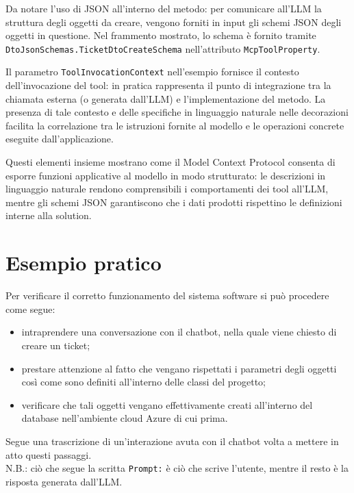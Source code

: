 Da notare l'uso di JSON all'interno del metodo: per comunicare all'LLM la struttura degli oggetti da creare, vengono forniti in input
gli schemi JSON degli oggetti in questione. Nel frammento mostrato, lo schema è fornito tramite \texttt{DtoJsonSchemas.TicketDtoCreateSchema}
nell'attributo \texttt{McpToolProperty}.

Il parametro \texttt{ToolInvocationContext} nell'esempio fornisce il contesto dell'invocazione del tool:
in pratica rappresenta il punto di integrazione tra la chiamata esterna (o generata dall'LLM) e l'implementazione del metodo.
La presenza di tale contesto e delle specifiche in linguaggio naturale nelle decorazioni facilita la correlazione tra le istruzioni fornite al modello
e le operazioni concrete eseguite dall'applicazione.

Questi elementi insieme mostrano come il Model Context Protocol consenta di esporre funzioni applicative al modello in modo strutturato:
le descrizioni in linguaggio naturale rendono comprensibili i comportamenti dei tool all'LLM, mentre gli schemi JSON garantiscono che i dati prodotti
rispettino le definizioni interne alla solution.

\section{Esempio pratico}
Per verificare il corretto funzionamento del sistema software si può procedere come segue:
\begin{itemize}
    \item intraprendere una conversazione con il chatbot, nella quale viene chiesto di creare un ticket;
    \item prestare attenzione al fatto che vengano rispettati i parametri degli oggetti così come sono definiti all'interno delle classi del progetto;
    \item verificare che tali oggetti vengano effettivamente creati all'interno del database nell'ambiente cloud Azure di cui prima.
\end{itemize}
Segue una trascrizione di un'interazione avuta con il chatbot volta a mettere in atto questi passaggi. \\
N.B.: ciò che segue la scritta \texttt{Prompt:} è ciò che scrive l'utente, mentre il resto è la risposta generata dall'LLM.

